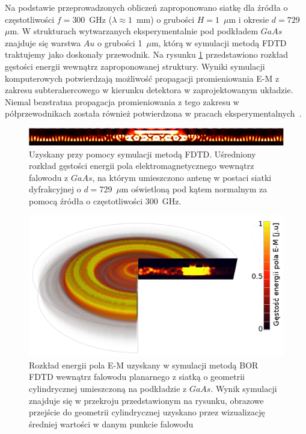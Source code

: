 Na podstawie przeprowadzonych obliczeń zaproponowano siatkę dla źródła o częstotliwości $f=300$~GHz ($\lambda\approx 1$~mm) o grubości $H=1$~$\mu$m i okresie $d=729$~$\mu$m. W strukturach wytwarzanych eksperymentalnie pod podkładem $GaAs$ znajduje się warstwa $Au$ o grubości 1~$\mu$m, którą w symulacji metodą FDTD traktujemy jako doskonały przewodnik. Na rysunku \ref{fig:consrc_1d_f300Ghz} przedstawiono rozkład gęstości energii wewnątrz zaproponowanej struktury. Wyniki symulacji komputerowych potwierdzają  możliwość propagacji promieniowania E-M z zakresu subterahercowego w kierunku detektora w zaprojektowanym układzie. Niemal bezstratna propagacja promieniowania z tego zakresu w półprzewodnikach została również potwierdzona w pracach eksperymentalnych~\cite{roux2002grating}.

\begin{figure}[tb]
	\includegraphics[width=\textwidth]{images/thz/consrc_siatka1d_300GHz_d729um.png}
	\caption{Uzyskany przy pomocy symulacji metodą FDTD. Uśredniony rozkład gęstości energii pola elektromagnetycznego wewnątrz falowodu z $GaAs$, na którym umieszczono antenę w postaci siatki dyfrakcyjnej o $d=$729~$\mu$m oświetloną pod kątem normalnym za pomocą źródła o częstotliwości 300~GHz.  }
	\label{fig:consrc_1d_f300Ghz}
\end{figure}

\begin{figure}[tb]
	\includegraphics[width=\textwidth]{images/antenaThz/tort.png}
	\caption{Rozkład energii pola E-M uzyskany w symulacji metodą BOR FDTD wewnątrz falowodu planarnego z siatką o geometrii cylindrycznej umieszczoną na podkładzie z $GaAs$. Wynik symulacji znajduje się w przekroju przedstawionym na rysunku, obrazowe przejście do geometrii cylindrycznej uzyskano przez wizualizację średniej wartości w danym punkcie falowodu}	
	\label{fig:concent_modfalo}
\end{figure}

